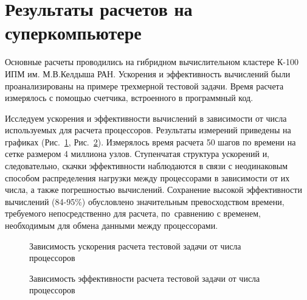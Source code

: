 \section{Результаты расчетов на суперкомпьютере} \label{ch:ch4/sect2}

Основные расчеты проводились на гибридном вычислительном кластере К-100 ИПМ им. М.В.Келдыша РАН.
Ускорения и эффективность вычислений были проанализированы на примере трехмерной тестовой задачи.
Время расчета измерялось с помощью счетчика, встроенного в программный код.

Исследуем ускорения и эффективности вычислений в зависимости от числа
используемых для расчета процессоров. Результаты измерений приведены
на графиках (Рис.~\ref{mpi_speedup}, Рис.~\ref{mpi_eff}).
Измерялось время расчета 50 шагов по времени на сетке размером 4 миллиона узлов.
Ступенчатая структура ускорений и, следовательно, скачки эффективности наблюдаются
в связи с неодинаковым способом распределения нагрузки между процессорами
в зависимости от их числа, а также погрешностью вычислений. Сохранение высокой
эффективности вычислений (84-95\%) обусловлено значительным превосходством времени, требуемого
непосредственно для расчета, по~сравнению с временем, необходимым для обмена данными
между процессорами.

\begin{figure}[!h]
\begin{center}
\caption{Зависимость ускорения расчета тестовой задачи от числа процессоров}
\label{mpi_speedup}
\end{center}
\end{figure}

\begin{figure}[!h]
\begin{center}
\caption{Зависимость эффективности расчета тестовой задачи от числа процессоров}
\label{mpi_eff}
\end{center}
\end{figure}

